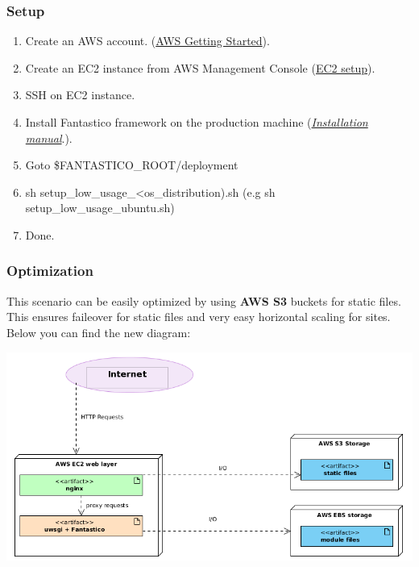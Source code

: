 \documentclass[letterpaper,10pt,english]{sphinxmanual}
\begin{document}
\subsubsection{Setup}
\label{how_to/deployment/aws_low_usage_scenario:setup}\begin{enumerate}
\item {} 
Create an AWS account. (\href{http://aws.amazon.com/documentation/gettingstarted/}{AWS Getting Started}).

\item {} 
Create an EC2 instance from AWS Management Console (\href{http://www.youtube.com/watch?v=WBro0TEAd7g}{EC2 setup}).

\item {} 
SSH on EC2 instance.

\item {} 
Install Fantastico framework on the production machine ({\hyperref[get_started/installation::doc]{\emph{Installation manual}}}.).

\item {} 
Goto \$FANTASTICO\_ROOT/deployment

\item {} 
sh setup\_low\_usage\_\textless{}os\_distribution).sh (e.g sh setup\_low\_usage\_ubuntu.sh)

\item {} 
Done.

\end{enumerate}


\subsubsection{Optimization}
\label{how_to/deployment/aws_low_usage_scenario:optimization}
This scenario can be easily optimized by using \textbf{AWS S3} buckets for static files. This ensures faileover for static
files and very easy horizontal scaling for sites. Below you can find the new diagram:

\includegraphics{low_usage_s3_aws.png}
\end{document}
